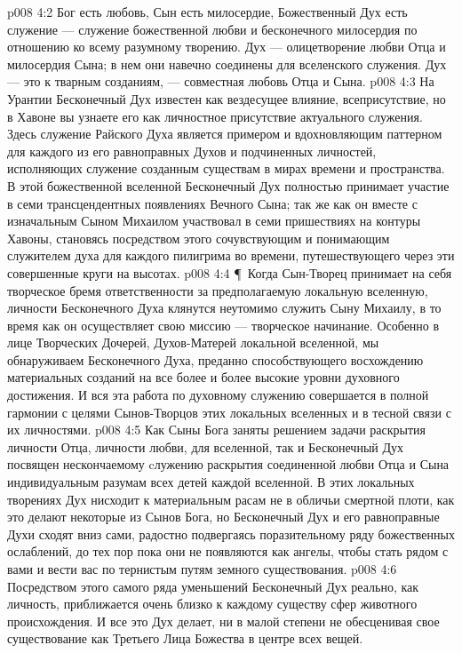 \vs p008 4:2 Бог есть любовь, Сын есть милосердие, Божественный Дух есть служение --- служение божественной любви и бесконечного милосердия по отношению ко всему разумному творению. Дух --- олицетворение любви Отца и милосердия Сына; в нем они навечно соединены для вселенского служения. Дух --- это   к тварным созданиям, --- совместная любовь Отца и Сына.
\vs p008 4:3 На Урантии Бесконечный Дух известен как вездесущее влияние, всеприсутствие, но в Хавоне вы узнаете его как личностное присутствие актуального служения. Здесь служение Райского Духа является примером и вдохновляющим паттерном для каждого из его равноправных Духов и подчиненных личностей, исполняющих служение созданным существам в мирах времени и пространства. В этой божественной вселенной Бесконечный Дух полностью принимает участие в семи трансцендентных появлениях Вечного Сына; так же как он вместе с изначальным Сыном Михаилом участвовал в семи пришествиях на контуры Хавоны, становясь посредством этого сочувствующим и понимающим служителем духа для каждого пилигрима во времени, путешествующего через эти совершенные круги на высотах.
\vs p008 4:4 \P\ Когда Сын\hyp{}Творец принимает на себя творческое бремя ответственности за предполагаемую локальную вселенную, личности Бесконечного Духа клянутся неутомимо служить Сыну Михаилу, в то время как он осуществляет свою миссию --- творческое начинание. Особенно в лице Творческих Дочерей, Духов\hyp{}Матерей локальной вселенной, мы обнаруживаем Бесконечного Духа, преданно способствующего восхождению материальных созданий на все более и более высокие уровни духовного достижения. И вся эта работа по духовному служению совершается в полной гармонии с целями Сынов\hyp{}Творцов этих локальных вселенных и в тесной связи с их личностями.
\vs p008 4:5 Как Сыны Бога заняты решением задачи раскрытия личности Отца, личности любви, для вселенной, так и Бесконечный Дух посвящен нескончаемому cлужению раскрытия соединенной любви Отца и Сына индивидуальным разумам всех детей каждой вселенной. В этих локальных творениях Дух нисходит к материальным расам не в обличьи смертной плоти, как это делают некоторые из Сынов Бога, но Бесконечный Дух и его равноправные Духи сходят вниз сами, радостно подвергаясь поразительному ряду божественных ослаблений, до тех пор пока они не появляются как ангелы, чтобы стать рядом с вами и вести вас по тернистым путям земного существования.
\vs p008 4:6 Посредством этого самого ряда уменьшений Бесконечный Дух реально, как личность, приближается очень близко к каждому существу сфер животного происхождения. И все это Дух делает, ни в малой степени не обесценивая свое существование как Третьего Лица Божества в центре всех вещей.
